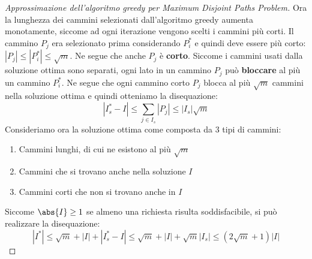 \documentclass[\main/main.tex]{subfiles}
\begin{document}
\begin{proof}[Approssimazione dell'algoritmo greedy per Maximum Disjoint Paths Problem]
    Ora la lunghezza dei cammini selezionati dall'algoritmo greedy aumenta monotamente, siccome ad ogni iterazione vengono scelti i cammini più corti. Il cammino \(P_j\) era selezionato prima considerando \(P^*_i\) e quindi deve essere più corto: \(\left|P_{j}\right| \leq\left|P_{i}^{*}\right| \leq \sqrt{m}\). Ne segue che anche \(P_j\) è \textbf{corto}. Siccome i cammini usati dalla soluzione ottima sono separati, ogni lato in un cammino \(P_j\) può \textbf{bloccare} al più un cammino \(P_i^*\). Ne segue che ogni cammino corto \(P_j\) blocca al più \(\sqrt{m}\) cammini nella soluzione ottima e quindi otteniamo la disequazione:
    \[
        \left|I_{s}^{*}-I\right| \leq \sum_{j \in I_{s}}\left|P_{j}\right| \leq\left|I_{s}\right| \sqrt{m}
    \]
    Consideriamo ora la soluzione ottima come composta da \(3\) tipi di cammini:
    \begin{enumerate}
        \item Cammini lunghi, di cui ne esistono al più \(\sqrt{m}\)
        \item Cammini che si trovano anche nella soluzione \(I\)
        \item Cammini corti che non si trovano anche in \(I\)
    \end{enumerate}
    Siccome \(\abs{I}\geq 1\) se almeno una richiesta risulta soddisfacibile, si può realizzare la disequazione:
    \[
        \left|I^{*}\right| \leq \sqrt{m}+|I|+\left|I_{s}^{*}-I\right| \leq \sqrt{m}+|I|+\sqrt{m}\left|I_{s}\right| \leq(2 \sqrt{m}+1)|I|
    \]
\end{proof}
\clearpage
\end{document}
